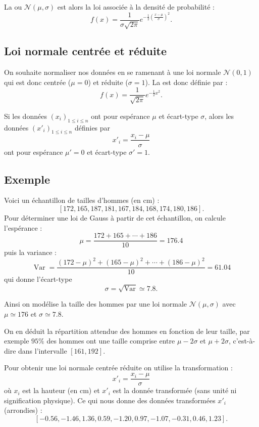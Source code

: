 \documentclass[11pt,class=report,crop=false]{standalone}
\begin{document}
La  ou  $\mathcal{N}(\mu,\sigma)$ est alors la loi associée à la densité de probabilité :
$$f(x) = \frac{1}{\sigma\sqrt{2\pi}} e^{-\frac12\left(\frac{x-\mu}{\sigma}\right)^2}.$$


\subsection{Loi normale centrée et réduite}

On souhaite normaliser nos données en se ramenant à une loi normale $\mathcal{N}(0,1)$ qui est donc centrée ($\mu=0$) et réduite ($\sigma=1$). 
La  est donc définie par :
$$f(x) = \frac{1}{\sqrt{2\pi}} e^{-\frac12 x^2}.$$



Si les données $(x_i)_{1\le i \le n}$ ont pour espérance $\mu$ et écart-type $\sigma$,
alors les données $(x'_i)_{1\le i \le n}$ définies par 
$$x'_i = \frac{x_i-\mu}{\sigma}$$
ont pour espérance $\mu'=0$ et écart-type $\sigma'=1$.

\subsection{Exemple}
Voici un échantillon de tailles d'hommes (en cm) :
$$[172,165,187,181,167,184,168,174,180,186].$$
Pour déterminer une loi de Gauss à partir de cet échantillon, on calcule l'espérance :
$$\mu = \frac{172 + 165 + \cdots + 186}{10} = 176.4$$
puis la variance : 
$$\operatorname{Var} = \frac{(172-\mu)^2+(165-\mu)^2+\cdots + (186-\mu)^2}{10} = 61.04$$
qui donne l'écart-type
$$\sigma = \sqrt{\operatorname{Var}} \simeq 7.8.$$


Ainsi on modélise la taille des hommes par une loi normale $\mathcal{N}(\mu,\sigma)$
avec $\mu\simeq 176$ et $\sigma\simeq 7.8$.



On en déduit la répartition attendue des hommes en fonction de leur taille, par exemple 
$95\%$ des hommes ont une taille comprise entre $\mu-2\sigma$ et $\mu+2\sigma$, c'est-à-dire dans l'intervalle $[161,192]$.

Pour obtenir une loi normale centrée réduite on utilise la transformation :
$$x'_i = \frac{x_i-\mu}{\sigma}$$
où $x_i$ est la hauteur (en cm) et $x'_i$ est la donnée transformée (sans unité ni signification physique).
Ce qui nous donne des données transformées $x'_i$ (arrondies) :
$$[-0.56, -1.46, 1.36,  0.59, -1.20,  0.97,  -1.07, -0.31, 0.46, 1.23].$$
\end{document}

